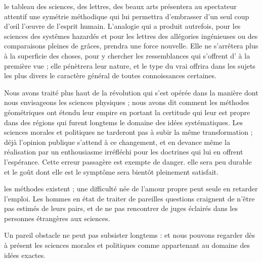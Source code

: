 \documentclass[11pt,a4paper]{article}
\begin{document}
le tableau des sciences, des lettres, des beaux arts présentera au
spectateur  attentif une symétrie méthodique qui lui
permettra d'embrasser d'un seul coup d'œil l'œuvre de l'esprit humain.
L'analogie qui a produit autrefois, pour les sciences des systêmes
hazardés et pour les lettres des allégories ingénieuses ou des
comparaisons pleines de grâces, prendra une force nouvelle. Elle ne
s'arrêtera plus à la superficie des choses, pour y chercher les
ressemblances qui s'offrent d' à la première vue ;
elle pénètrera leur nature, et le type du vrai  offrira
dans les sujets les plus divers  le caractère général de toutes connoissances certaines.

 Nous avons traité plus haut de la
révolution qui s'est opérée dans la manière dont nous envisageons les
sciences  physiques ; nous avons dit comment les méthodes
géométriques ont étendu leur empire en portant la certitude qui leur est
propre dans des régions qui furent longtems le domaine des idées
systématiques. Les sciences morales et politiques ne tarderont pas à
subir la même transformation ; déjà l'opinion publique s'attend à ce
changement, et en devance même la réalisation par un enthousiasme
irréfléchi pour les doctrines qui lui en offrent l'espérance. Cette
erreur passagère est exempte de danger. elle sera peu durable et le goût
dont elle est le symptôme sera bientôt pleinement satisfait.

les méthodes existent ; une difficulté née de l'amour propre peut seule
en retarder l'emploi. Les hommes en état de traiter de pareilles
questions  craignent de n'être pas estimés de
leurs pairs, et de ne pas rencontrer de juges éclairés dans les
personnes étrangères aux sciences.

Un pareil obstacle ne peut pas subsister  longtems : et
nous pouvons  regarder dès à présent les sciences morales
et politiques comme appartenant au domaine des idées exactes.
\end{document}
